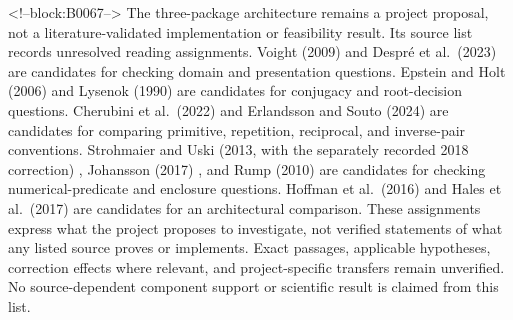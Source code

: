 \documentclass[11pt,a4paper]{article}
\begin{document}
<!--block:B0067-->
The three-package architecture remains a project proposal, not a literature-validated implementation or feasibility result. Its source list records unresolved reading assignments. Voight (2009)
\citep{P33-S10}
 and Despré et al.~(2023)
\citep{P33-S11}
 are candidates for checking domain and presentation questions. Epstein and Holt (2006)
\citep{P33-S12}
 and Lysenok (1990)
\citep{P33-S13}
 are candidates for conjugacy and root-decision questions. Cherubini et al.~(2022)
\citep{P33-S14}
 and Erlandsson and Souto (2024)
\citep{P33-S15}
 are candidates for comparing primitive, repetition, reciprocal, and inverse-pair conventions. Strohmaier and Uski (2013, with the separately recorded 2018 correction)
\citep{P33-S16,P33-S16-CORR}
, Johansson (2017)
\citep{P33-S17}
, and Rump (2010)
\citep{P33-S18}
 are candidates for checking numerical-predicate and enclosure questions. Hoffman et al.~(2016)
\citep{P33-S19}
 and Hales et al.~(2017)
\citep{P33-S20}
 are candidates for an architectural comparison. These assignments express what the project proposes to investigate, not verified statements of what any listed source proves or implements. Exact passages, applicable hypotheses, correction effects where relevant, and project-specific transfers remain unverified. No source-dependent component support or scientific result is claimed from this list.
\end{document}
